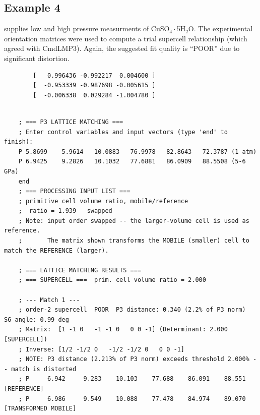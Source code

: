 \documentclass[preprint]{iucr}              %
\numberwithin{equation}{section}
\begin{document}
{\begin{verbatim}
\end{verbatim}

\subsection{Example 4}
\cite{parsons2026} supplies low and high pressure
measurments of CuSO$_4\cdot$5H$_2$O. The experimental
orientation matrices were used to compute a trial
supercell relationship (which agreed with CmdLMP3). 
Again, the suggested fit quality is ``POOR'' due
to significant distortion.
\begin{verbatim}
		[   0.996436 -0.992217  0.004600 ]
		[  -0.953339 -0.987698 -0.005615 ]
		[  -0.006338  0.029284 -1.004780 ]
\end{verbatim}

\begin{verbatim}

	; === P3 LATTICE MATCHING ===
	; Enter control variables and input vectors (type 'end' to finish):
	P 5.8699    5.9614   10.0883   76.9978   82.8643   72.3787 (1 atm)
	P 6.9425    9.2826   10.1032   77.6881   86.0909   88.5508 (5-6 GPa)
	end
	; === PROCESSING INPUT LIST ===
	; primitive cell volume ratio, mobile/reference
	;  ratio = 1.939   swapped
	; Note: input order swapped -- the larger-volume cell is used as reference.
	;       The matrix shown transforms the MOBILE (smaller) cell to match the REFERENCE (larger).
	
	; === LATTICE MATCHING RESULTS ===
	; === SUPERCELL ===  prim. cell volume ratio = 2.000
	
	; --- Match 1 ---
	; order-2 supercell  POOR  P3 distance: 0.340 (2.2% of P3 norm)  S6 angle: 0.99 deg
	; Matrix:  [1 -1 0   -1 -1 0   0 0 -1] (Determinant: 2.000  [SUPERCELL])
	; Inverse: [1/2 -1/2 0   -1/2 -1/2 0   0 0 -1]
	; NOTE: P3 distance (2.213% of P3 norm) exceeds threshold 2.000% -- match is distorted
	; P     6.942     9.283    10.103    77.688    86.091    88.551  [REFERENCE]
	; P     6.986     9.549    10.088    77.478    84.974    89.070  [TRANSFORMED MOBILE]
	
	
\end{verbatim}

%


}
\end{document}
